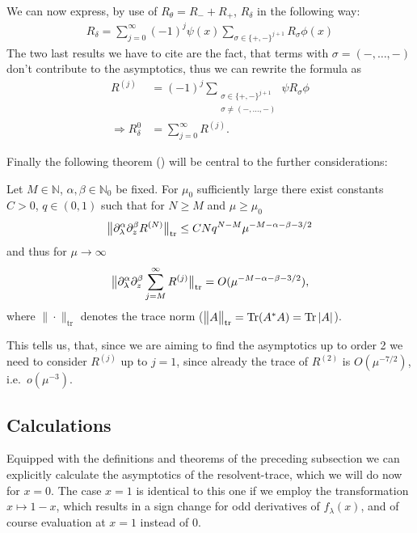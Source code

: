 We can now express, by use of $R_\theta = R_- + R_+$, $R_\delta$ in the
following way:
\begin{align}
  R_\delta = \sum_{j=0}^\infty (-1)^j \psi(x) \sum_{\sigma\in\{+,-\}^{j+1}}
  R_\sigma \phi(x)
\end{align}
The two last results we have to cite are the fact, that terms with $\sigma =
(-,\ldots,-)$ don't contribute to the asymptotics, thus we can rewrite the
formula as
\begin{align}
  R^{(j)} &= (-1)^j \sum_{ \substack{ \sigma\in\{+,-\}^{j+1} \\
  \sigma\neq(-,\ldots,-) } } \psi R_\sigma \phi \\
  \Rightarrow R^0_\delta &= \sum_{j=0}^\infty R^{(j)}.
\end{align}

Finally the following theorem (\cite[Prop 2.2]{LV13}) will be central to the
further considerations:
\begin{Theorem}
  \label{thm:r-expansion}
  Let $M\in\mathbb{N}$, $\alpha,\beta\in\mathbb{N}_0$ be fixed. For $\mu_0$
  sufficiently large there exist constants $C>0$, $q\in(0,1)$ such that for
  $N\geq M$ and $\mu \geq \mu_0$
  \begin{align}
    \Norm[\mathrm{tr}]{\partial_\lambda^\alpha\partial^\beta_z R^{(N)}}
    \leq CNq^{N-M}\mu^{-M-\alpha-\beta-3/2}
  \end{align}
  and thus for $\mu\to\infty$
  \begin{align}
    \Norm[\mathrm{tr}]{\partial^\alpha_\lambda\partial^\beta_z\sum_{j=M}^\infty
    R^{(j)}} = O(\mu^{-M-\alpha-\beta-3/2}),
  \end{align}
  where $\|\cdot\|_{\mathrm{tr}}$ denotes the trace norm
  ($\Norm[\mathrm{tr}]{A} = \Tr(A^*A) = \Tr\Abs{A}$).
\end{Theorem}
This tells us, that, since we are aiming to find the asymptotics up to order 2
we need to consider $R^{(j)}$ up to $j=1$, since already the trace of $R^{(2)}$
is $O(\mu^{-7/2})$, i.e.\ $o(\mu^{-3})$.

\subsection{Calculations}
Equipped with the definitions and theorems of the preceding subsection we can
explicitly calculate the asymptotics of the resolvent-trace, which we will do
now for $x=0$. The case $x=1$ is identical to this one if we employ the
transformation $x\mapsto 1-x$, which results in a sign change for odd
derivatives of $f_\lambda(x)$, and of course evaluation at $x=1$ instead of $0$.


